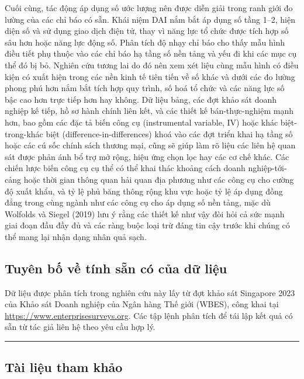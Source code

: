 \documentclass[12pt,a4paper]{article}
\begin{document}
Cuối cùng, tác động áp dụng số ước lượng nên được diễn giải trong ranh
giới đo lường của các chỉ báo có sẵn. Khái niệm DAI nắm bắt áp dụng số
tầng 1--2, hiện diện số và sử dụng giao dịch điện tử, thay vì năng lực
tổ chức được tích hợp số sâu hơn hoặc năng lực động số. Phân tích độ
nhạy chỉ báo cho thấy mẫu hình điều tiết phụ thuộc vào các chỉ báo hạ
tầng số nền tảng và yếu đi khi các mục cụ thể đó bị bỏ. Nghiên cứu tương
lai do đó nên xem xét liệu cùng mẫu hình có điều kiện có xuất hiện trong
các nền kinh tế tiên tiến về số khác và dưới các đo lường phong phú hơn
nắm bắt tích hợp quy trình, số hoá tổ chức và các năng lực số bậc cao
hơn trực tiếp hơn hay không. Dữ liệu bảng, các đợt khảo sát doanh nghiệp
kế tiếp, hồ sơ hành chính liên kết, và các thiết kế bán-thực-nghiệm mạnh
hơn, bao gồm các đặc tả biến công cụ (instrumental variable, IV) hoặc
khác biệt-trong-khác biệt (difference-in-differences) khoá vào các đợt
triển khai hạ tầng số hoặc các cú sốc chính sách thương mại, cũng sẽ
giúp làm rõ liệu các liên hệ quan sát được phản ánh bổ trợ mở rộng, hiệu
ứng chọn lọc hay các cơ chế khác. Các chiến lược biến công cụ cụ thể có
thể khai thác khoảng cách doanh nghiệp-tới-cảng hoặc thời gian thông
quan hải quan địa phương như các công cụ cho cường độ xuất khẩu, và tỷ
lệ phủ băng thông rộng khu vực hoặc tỷ lệ áp dụng đồng đẳng trong cùng
ngành như các công cụ cho áp dụng số nền tảng, mặc dù Wolfolds và Siegel
(2019) lưu ý rằng các thiết kế như vậy đòi hỏi cả sức mạnh giai đoạn đầu
đầy đủ và các ràng buộc loại trừ đáng tin cậy trước khi chúng có thể
mang lại nhận dạng nhân quả sạch.

\hypertarget{tuyuxean-bux1ed1-vux1ec1-tuxednh-sux1eb5n-cuxf3-cux1ee7a-dux1eef-liux1ec7u}{%
\subsection{Tuyên bố về tính sẵn có của dữ
liệu}\label{tuyuxean-bux1ed1-vux1ec1-tuxednh-sux1eb5n-cuxf3-cux1ee7a-dux1eef-liux1ec7u}}

Dữ liệu được phân tích trong nghiên cứu này lấy từ đợt khảo sát
Singapore 2023 của Khảo sát Doanh nghiệp của Ngân hàng Thế giới (WBES),
công khai tại \url{https://www.enterprisesurveys.org}. Các tập lệnh phân
tích để tái lập kết quả có sẵn từ tác giả liên hệ theo yêu cầu hợp lý.

\begin{center}\rule{0.5\linewidth}{0.5pt}\end{center}

\hypertarget{tuxe0i-liux1ec7u-tham-khux1ea3o}{%
\subsection{Tài liệu tham khảo}\label{tuxe0i-liux1ec7u-tham-khux1ea3o}}
\end{document}
